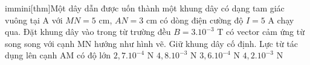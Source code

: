\begin{vidu} %
immini[thm]{Một dây dẫn được uốn thành một khung dây có dạng tam giác vuông tại A với $MN = 5$ cm, $AN = 3$ cm có dòng điện cường độ $I = 5$ A chạy qua. Đặt khung dây vào trong từ trường đều $B = 3. 10^{-3}$ T có vector cảm ứng từ song song với cạnh MN hướng như hình vẽ. Giữ khung dây cố định. Lực từ tác dụng lên cạnh AM có độ lớn
\choice
{$2,7. 10^{-4}$ N}
{$4,8. 10^{-3}$ N}
{\True $3,6. 10^{-4}$ N}
{$4,2. 10^{-3}$ N}}
{}
\end{vidu}